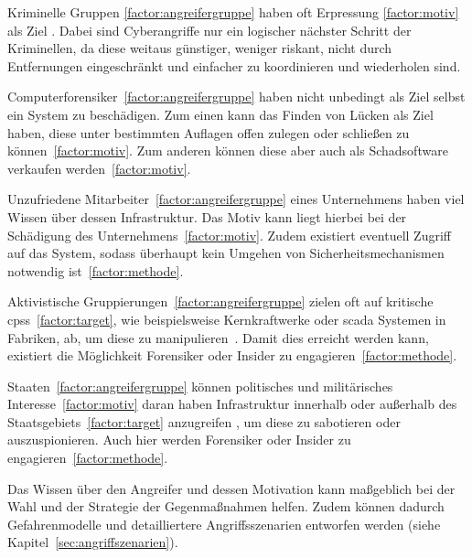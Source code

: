 \documentclass[final,bibliography=totocnumbered]{include/sikseminar}
\newcommand{\cps}{\glspl{cps}\xspace}
\begin{document}
Kriminelle Gruppen \ref{factor:angreifergruppe} haben oft Erpressung \ref{factor:motiv} als Ziel \cite{WYX+10}.
Dabei sind Cyberangriffe nur ein logischer nächster Schritt der Kriminellen, da diese weitaus günstiger, weniger riskant, nicht durch Entfernungen eingeschränkt und einfacher zu koordinieren und wiederholen sind. \cite{CAS+09}

Computerforensiker~\ref{factor:angreifergruppe} haben nicht unbedingt als Ziel selbst ein System zu beschädigen.
Zum einen kann das Finden von Lücken als Ziel haben, diese unter bestimmten Auflagen offen zulegen oder schließen zu können~\ref{factor:motiv}. 
Zum anderen können diese aber auch als Schadsoftware verkaufen werden~\ref{factor:motiv}. 

Unzufriedene Mitarbeiter~\ref{factor:angreifergruppe} eines Unternehmens haben viel Wissen über dessen Infrastruktur.
Das Motiv kann liegt hierbei bei der Schädigung des Unternehmens~\ref{factor:motiv}.
Zudem existiert eventuell Zugriff auf das System, sodass überhaupt kein Umgehen von Sicherheitsmechanismen notwendig ist~\ref{factor:methode}.~\cite{CAS+09,WYX+10}

Aktivistische Gruppierungen~\ref{factor:angreifergruppe} zielen oft auf kritische \cps~\ref{factor:target}, wie beispielsweise Kernkraftwerke oder \gls{scada} Systemen in Fabriken, ab, um diese zu manipulieren~\cite{CAS+09,HLL+17}. 
Damit dies erreicht werden kann, existiert die Möglichkeit Forensiker oder Insider zu engagieren~\ref{factor:methode}.~\cite{WYX+10}

Staaten~\ref{factor:angreifergruppe} können politisches und militärisches Interesse~\ref{factor:motiv} daran haben Infrastruktur innerhalb oder außerhalb des Staatsgebiets~\ref{factor:target} anzugreifen \cite{CAS+09}, um diese zu sabotieren oder auszuspionieren.
Auch hier werden Forensiker oder Insider zu engagieren~\ref{factor:methode}.

Das Wissen über den Angreifer und dessen Motivation kann maßgeblich bei der Wahl und der Strategie der Gegenmaßnahmen helfen.
Zudem können dadurch Gefahrenmodelle und detailliertere Angriffsszenarien entworfen werden (siehe Kapitel~\ref{sec:angriffszenarien}).
\end{document}
